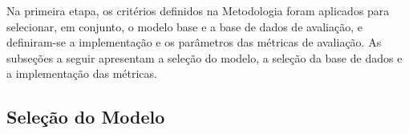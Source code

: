 Na primeira etapa, os critérios definidos na Metodologia foram aplicados para
selecionar, em conjunto, o modelo base e a base de dados de avaliação, e definiram-se a
implementação e os parâmetros das métricas de avaliação. As subseções a seguir apresentam a
seleção do modelo, a seleção da base de dados e a implementação das métricas.

\subsection{Seleção do Modelo}\label{sec:modelo}

